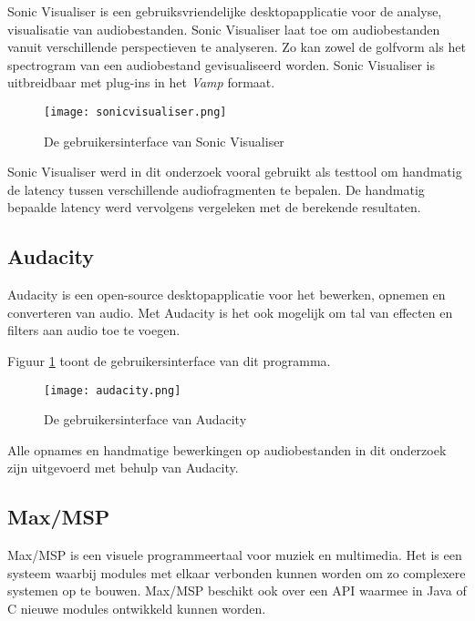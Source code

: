 Sonic Visualiser is een gebruiksvriendelijke desktopapplicatie voor de analyse, visualisatie van audiobestanden. Sonic Visualiser laat toe om audiobestanden vanuit verschillende perspectieven te analyseren. Zo kan zowel de golfvorm als het spectrogram van een audiobestand gevisualiseerd worden. Sonic Visualiser is uitbreidbaar met plug-ins in het \textit{Vamp} formaat. \cite{cannam2010sonic}

\begin{figure}[!h]
	\captionsetup{width=0.6\textwidth}
	\caption[Gebruikersinterface van Sonic Visualiser]{De gebruikersinterface van Sonic Visualiser}
	\advance\parskip0.3cm
	\centering
	\texttt{[image: sonicvisualiser.png]}
\end{figure}

Sonic Visualiser werd in dit onderzoek vooral gebruikt als testtool om handmatig de latency tussen verschillende audiofragmenten te bepalen. De handmatig bepaalde latency werd vervolgens vergeleken met de berekende resultaten.

\subsection{Audacity}

Audacity is een open-source desktopapplicatie voor het bewerken, opnemen en converteren van audio. Met Audacity is het ook mogelijk om tal van effecten en filters aan audio toe te voegen.\cite{audacity2016} 

Figuur \ref{screenshot-audacity} toont de gebruikersinterface van dit programma.

\begin{figure}[!h]
	\captionsetup{width=0.6\textwidth}
	\caption[Gebruikersinterface van Audacity]{De gebruikersinterface van Audacity}
	\centering
	\advance\parskip0.3cm
	\texttt{[image: audacity.png]}
	\label{screenshot-audacity}
\end{figure}

Alle opnames en handmatige bewerkingen op audiobestanden in dit onderzoek zijn uitgevoerd met behulp van Audacity. 

\subsection{Max/MSP}

Max/MSP is een visuele programmeertaal voor muziek en multimedia. Het is een systeem waarbij modules met elkaar verbonden kunnen worden om zo complexere systemen op te bouwen. Max/MSP beschikt ook over een API waarmee in Java of C nieuwe modules ontwikkeld kunnen worden. \cite{cycling2016}

